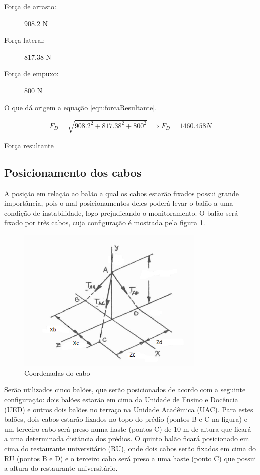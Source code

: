 	\begin{description}
		\item[Força de arrasto:] 908.2 N
		\item[Força lateral:] 817.38 N
		\item[Força de empuxo:] 800 N
	\end{description}

	O que dá origem a equação \eqref{eqn:forcaResultante}.

	\begin{equacao}
		\begin{equation}
			F_D = \sqrt{908.2^2 + 817.38^2 + 800^2} \implies F_D = 1460.458 N
		\end{equation}
		\caption{Força resultante}
		\label{eqn:forcaResultante}
	\end{equacao}

\subsection{Posicionamento dos cabos}

	A posição em relação ao balão a qual os cabos estarão fixados possui grande importância, pois o mal posicionamentos deles poderá levar o balão a uma condição de instabilidade, logo prejudicando o monitoramento. O balão será fixado por três cabos, cuja  configuração é mostrada pela figura \ref{img:coordcabos}.

	\begin{figure}[H]
		\centering
		\includegraphics[width=0.8\textwidth]{figuras/coorcabo}
		\caption[Coordenadas do cabo]{Coordenadas do cabo~\cite{beer}}
		\label{img:coordcabos}
	\end{figure}

	Serão utilizados cinco balões, que serão posicionados de acordo com a seguinte configuração: dois balões estarão em cima da Unidade de Ensino e Docência (UED) e outros dois balões no terraço na Unidade Acadêmica (UAC). Para estes balões, dois cabos estarão fixados no topo do prédio (pontos B e C na figura) e um terceiro cabo será preso numa haste (pontos C) de 10 m de altura que ficará a uma determinada distância dos prédios. O quinto balão ficará posicionado em cima do restaurante universitário (RU), onde dois cabos serão fixados em cima do RU (pontos B e D) e o terceiro cabo será preso a uma haste (ponto C) que possui a altura do restaurante universitário.

